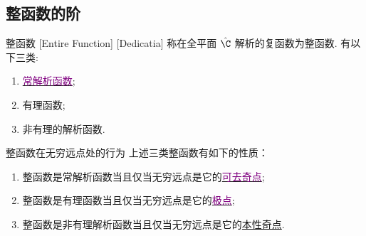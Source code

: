 \documentclass[UTF8]{ctexart}
\newcommand{\hyperrefc}[2]{\hyperref[#1]{\textcolor{purple}{#2}}}
\newcommand{\EssentialSingularity}{\hyperref[dfn:EssentialSingularity]{本性奇点}}
\begin{document}
\subsection{整函数的阶}
\begin{dfn}
    [EntireFunction]
    {整函数}
    [Entire Function]
    [Dedicatia]
    称在全平面 \( \hat{\C} \) 解析的复函数为整函数. 有以下三类: 
    \begin{enumerate}
        \item \hyperrefc{ppt:TrivialAnalyticalFunction}{常解析函数}; 
        \item 有理函数; 
        \item 非有理的解析函数. 
    \end{enumerate}
\end{dfn}
\begin{ppt}
    {整函数在无穷远点处的行为}
    上述三类整函数有如下的性质：
    \begin{enumerate}
        \item 整函数是常解析函数当且仅当无穷远点是它的\hyperrefc{dfn:RemovableSingularity}{可去奇点};
        \item 整函数是有理函数当且仅当无穷远点是它的\hyperrefc{dfn:PolarSingularity}{极点};
        \item 整函数是非有理解析函数当且仅当无穷远点是它的\EssentialSingularity.
    \end{enumerate}
\end{ppt}
\end{document}
